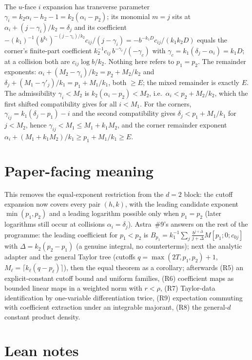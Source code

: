 \documentclass[11pt]{article}
\begin{document}
The $u$-face $i$ expansion has transverse parameter $\gamma_i=k_2\alpha_i-h_2-1=k_2(\alpha_i-p_2)$;
its monomial $m=j$ sits at $\alpha_i+(j-\gamma_i)/k_2=\delta_j$ and its coefficient
$-(k_1)^{-1}(b^{k_1})^{-(j-\gamma_i)/k_2}c_{ij}/(j-\gamma_i)=-b^{-k_1D}c_{ij}/(k_1k_2D)$ equals the
corner's finite-part coefficient $k_2^{-1}c_{ij}\,b^{-\gamma_c}/(-\gamma_c)$ with
$\gamma_c=k_1(\delta_j-\alpha_i)=k_1D$; at a collision both are $c_{ij}\log b/k_2$. Nothing here
refers to $p_1=p_2$. The remainder exponents: $\alpha_i+(M_2-\gamma_i)/k_2=p_2+M_2/k_2$ and
$\delta_j+(M_1-\gamma'_j)/k_1=p_1+M_1/k_1$, both $\ge E$; the mixed remainder is exactly $E$. The
admissibility $\gamma_i<M_2$ is $k_2(\alpha_i-p_2)<M_2$, i.e.\ $\alpha_i<p_2+M_2/k_2$, which the
first shifted compatibility gives for all $i<M_1$. For the corners, $\gamma_{ij}=k_1(\delta_j-p_1)-i$
and the second compatibility gives $\delta_j<p_1+M_1/k_1$ for $j<M_2$, hence $\gamma_{ij}<M_1\le
M_1+k_1M_2$, and the corner remainder exponent $\alpha_i+(M_1+k_1M_2)/k_1\ge p_1+M_1/k_1\ge E$.

\section{Paper-facing meaning}

This removes the equal-exponent restriction from the $d=2$ block: the cutoff expansion now covers
every pair $(h,k)$, with the leading candidate exponent $\min(p_1,p_2)$ and a leading logarithm
possible only when $p_1=p_2$ (later logarithms still occur at collisions $\alpha_i=\delta_j$).
Astra~\#9's answers on the rest of the programme: the leading coefficient for $p_1<p_2$ is
$B_{p_1}=k_1^{-1}\sum_j\frac{b^{j+\Delta}}{j+\Delta}M[p_1;0;c_{0j}]$ with $\Delta=k_2(p_2-p_1)$
(a genuine integral, no counterterms); next the analytic adapter and the general Taylor tree
(cutoffs $q=\max(2T,p_1,p_2)+1$, $M_\ell=\lceil k_\ell(q-p_\ell)\rceil$), then the equal theorem as a
corollary; afterwards (R5) an explicit-constant cutoff bound and uniform families, (R6) coefficient
maps as bounded linear maps in a weighted norm with $r<\rho$, (R7) Taylor-data identification by
one-variable differentiation twice, (R9) expectation commuting with coefficient extraction under an
integrable majorant, (R8) the general-$d$ constant product density.

\section{Lean notes}
\end{document}
